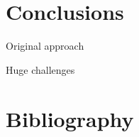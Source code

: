 \documentclass[xcolor={usenames,dvipsnames}]{beamer}
\newcommand{\sectiontitle}{}
\newcommand{\newsection}[1]{\renewcommand{\sectiontitle}{#1}\section{#1}}
\newcommand{\newHsection}[1]{\renewcommand{\sectiontitle}{#1}\section*{#1}}
\begin{document}
\newsection{Conclusions}

\begin{frame}{Original approach}
\end{frame}


\setcounter{finalframe}{\value{framenumber}}

\begin{frame}{Huge challenges}
\end{frame}


\newHsection{Bibliography}
%



\end{document}
